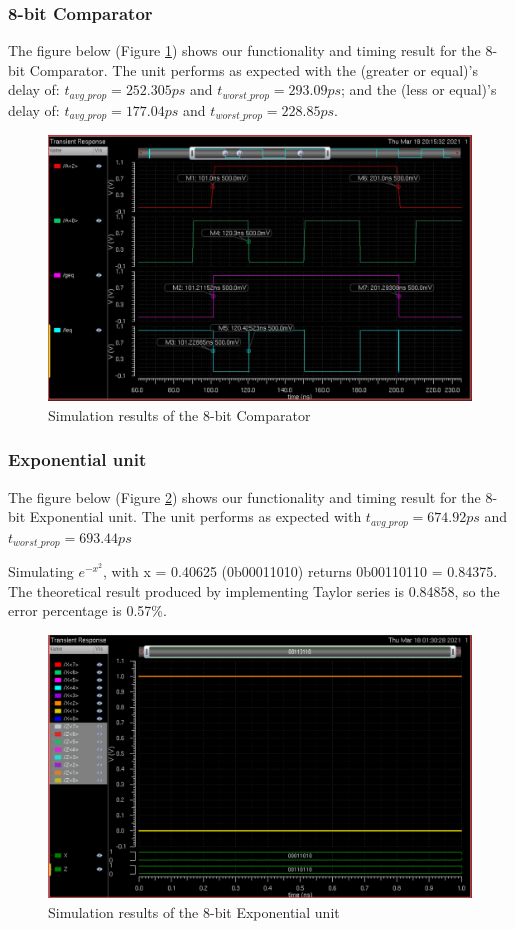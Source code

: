 \documentclass[letterpaper, 11pt]{article}
\begin{document}
	\subsubsection{8-bit Comparator}
	
	The figure below (Figure \ref{fig32}) shows our functionality and timing result for the 8-bit Comparator. The unit performs as expected with the (greater or equal)'s delay of: $t_{avg\_prop} = 252.305ps$ and $t_{worst\_prop} = 293.09ps$; and the (less or equal)'s delay of: $t_{avg\_prop} = 177.04ps$ and $t_{worst\_prop} = 228.85ps$.
	
	\begin{figure}[htb!]
		\centering
		\includegraphics[width=0.85\linewidth]{report_pics/comp8b_sim.jpg}
		\caption{Simulation results of the 8-bit Comparator}
		\label{fig32}
	\end{figure}
	
	
	\subsubsection{Exponential unit}
	
	The figure below (Figure \ref{fig33}) shows our functionality and timing result for the 8-bit Exponential unit. The unit performs as expected with $t_{avg\_prop} = 674.92ps$ and $t_{worst\_prop} = 693.44ps$ 
	
	Simulating $e^{-x^2}$, with x = 0.40625 (0b00011010) returns 0b00110110 = 0.84375. The theoretical result produced by implementing Taylor series is 0.84858, so the error percentage is 0.57\%.
	
	\begin{figure}[htb!]
		\centering
		\includegraphics[width=0.85\linewidth]{report_pics/exp8b_sim.png}
		\caption{Simulation results of the 8-bit Exponential unit}
		\label{fig33}
	\end{figure}
	
\end{document}
